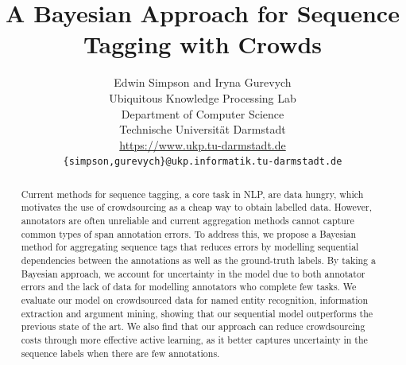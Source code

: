 \documentclass[11pt,a4paper]{article}
\title{A Bayesian Approach for Sequence Tagging with Crowds}
\author{Edwin Simpson and Iryna Gurevych\\
  Ubiquitous Knowledge Processing Lab \\
  Department of Computer Science \\
  Technische Universit\"at Darmstadt \\
  \url{https://www.ukp.tu-darmstadt.de} \\
  {\tt \{simpson,gurevych\}@ukp.informatik.tu-darmstadt.de}
}
\begin{document}
\maketitle


\begin{abstract}
Current methods for sequence tagging, a core task in NLP, are data hungry,
which motivates the use of crowdsourcing as a cheap way to obtain labelled data.
However, annotators are often unreliable and current aggregation methods cannot capture common types of span annotation errors.
To address this, we propose a Bayesian method for aggregating sequence tags
 that reduces errors by modelling sequential dependencies between the
 annotations as well as the ground-truth labels.
By taking a Bayesian approach, we account for uncertainty in the model due to both
annotator errors and 
the lack of data for modelling annotators who complete few tasks.
We evaluate our model on crowdsourced data for named entity recognition, information extraction and argument mining,
showing that our sequential model outperforms the previous state of the art. 
We also find that
 our approach can reduce crowdsourcing costs through
 more effective active learning, as it 
better captures uncertainty in the sequence labels when there are few annotations.
\end{abstract}









\end{document}

